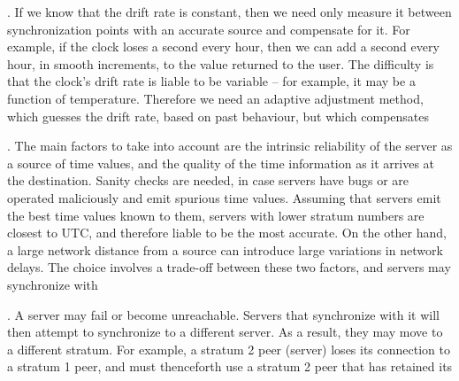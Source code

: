 \documentclass[12pt]{article}
\newcounter{question}
\newcommand{\question}[1]{
    \stepcounter{question}
    \thequestion. #1 \hfill
}
\begin{document}
\question{If we know that the drift rate is constant, then we need only measure it between synchronization points with 
an accurate source and compensate for it. For example, if the clock loses a second every hour, then we can add 
a second every hour, in smooth increments, to the value returned to the user. The difficulty is that the clock’s 
drift rate is liable to be variable – for example, it may be a function of temperature. Therefore we need an 
adaptive adjustment method, which guesses the drift rate, based on past behaviour, but which compensates }

\question{The main factors to take into account are the intrinsic reliability of the server as a source of time values, and 
the quality of the time information as it arrives at the destination. Sanity checks are needed, in case servers 
have bugs or are operated maliciously and emit spurious time values. Assuming that servers emit the best time 
values known to them, servers with lower stratum numbers are closest to UTC, and therefore liable to be the 
most accurate. On the other hand, a large network distance from a source can introduce large variations in 
network delays. The choice involves a trade-off between these two factors, and servers may synchronize with}

\question{
A server may fail or become unreachable. Servers that synchronize with it will then attempt to synchronize to 
a different server. As a result, they may move to a different stratum. For example, a stratum 2 peer (server) 
loses its connection to a stratum 1 peer, and must thenceforth use a stratum 2 peer that has retained its }
\end{document}

